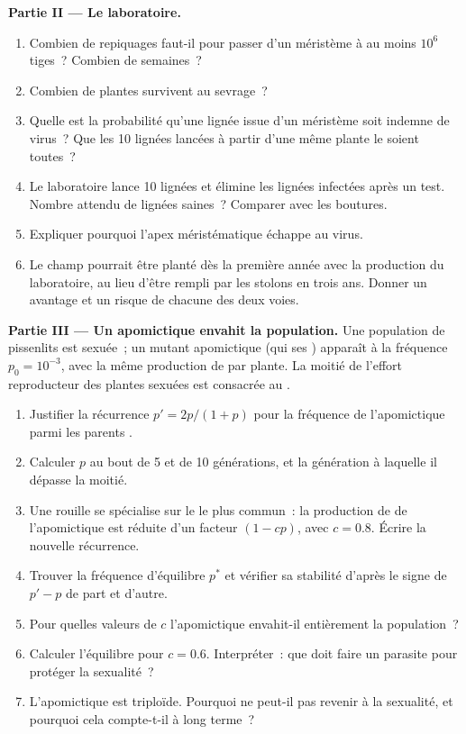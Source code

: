 \begin{problem}
\medskip
\noindent\textbf{Partie II --- Le laboratoire.}
\begin{enumerate}[resume]
  \item Combien de repiquages faut-il pour passer d'un méristème à au
        moins $10^{6}$ tiges~? Combien de semaines~?
  \item Combien de plantes survivent au sevrage~?
  \item Quelle est la probabilité qu'une lignée issue d'un méristème
        soit indemne de virus~? Que les \num{10} lignées lancées à partir
        d'une même plante le soient toutes~?
  \item Le laboratoire lance \num{10} lignées et élimine les lignées
        infectées après un test. Nombre attendu de lignées saines~?
        Comparer avec les boutures.
  \item Expliquer pourquoi l'apex méristématique échappe au virus.
  \item Le champ pourrait être planté dès la première année avec la
        production du laboratoire, au lieu d'être rempli par les stolons
        en trois ans. Donner un avantage et un risque de chacune des deux
        voies.
\end{enumerate}

\medskip
\noindent\textbf{Partie III --- Un apomictique envahit la population.}
Une population de pissenlits est sexuée~; un mutant apomictique (qui
 ses ) apparaît à la fréquence $p_0 = 10^{-3}$, avec la même
production de  par plante. La moitié de l'effort reproducteur des
plantes sexuées est consacrée au .
\begin{enumerate}[resume]
  \item Justifier la récurrence $p' = 2p/(1 + p)$ pour la fréquence de
        l'apomictique parmi les parents .
  \item Calculer $p$ au bout de 5 et de 10 générations, et la
        génération à laquelle il dépasse la moitié.
  \item Une rouille se spécialise sur le  le plus commun~: la
        production de  de l'apomictique est réduite d'un facteur
        $(1 - cp)$, avec $c = 0.8$. Écrire la nouvelle récurrence.
  \item Trouver la fréquence d'équilibre $p^*$ et vérifier sa stabilité
        d'après le signe de $p' - p$ de part et d'autre.
  \item Pour quelles valeurs de $c$ l'apomictique envahit-il entièrement
        la population~?
  \item Calculer l'équilibre pour $c = 0.6$. Interpréter~: que doit
        faire un parasite pour protéger la sexualité~?
  \item L'apomictique est triploïde. Pourquoi ne peut-il pas revenir à
        la sexualité, et pourquoi cela compte-t-il à long terme~?
\end{enumerate}


\end{problem}
